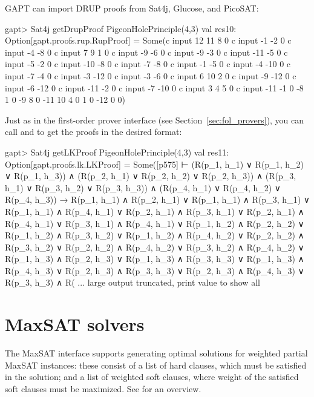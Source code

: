 \documentclass[a4paper,11pt]{book}
\newcommand{\cli}[1]{{\ttfamily {#1}}}
\begin{document}
GAPT can import DRUP proofs from Sat4j, Glucose, and PicoSAT:
\begin{clilisting}
gapt> Sat4j getDrupProof PigeonHolePrinciple(4,3)
val res10: Option[gapt.proofs.rup.RupProof] = Some(c input 12 11 8 0
c input -1 -2 0
c input -4 -8 0
c input 7 9 1 0
c input -9 -6 0
c input -9 -3 0
c input -11 -5 0
c input -5 -2 0
c input -10 -8 0
c input -7 -8 0
c input -1 -5 0
c input -4 -10 0
c input -7 -4 0
c input -3 -12 0
c input -3 -6 0
c input 6 10 2 0
c input -9 -12 0
c input -6 -12 0
c input -11 -2 0
c input -7 -10 0
c input 3 4 5 0
c input -11 -1 0
-8 1 0
-9 8 0
-11 10 4 0
1 0
-12 0
 0)

\end{clilisting}

Just as in the first-order prover interface (see Section~\ref{sec:fol_provers}), you can call
\cli{getResolutionProof} and \cli{getLKProof} to get the proofs in the desired
format:
\begin{clilisting}
gapt> Sat4j getLKProof PigeonHolePrinciple(4,3)
val res11: Option[gapt.proofs.lk.LKProof] = Some([p575] 
⊢
(R(p_1, h_1) ∨ R(p_1, h_2) ∨ R(p_1, h_3)) ∧
    (R(p_2, h_1) ∨ R(p_2, h_2) ∨ R(p_2, h_3)) ∧
    (R(p_3, h_1) ∨ R(p_3, h_2) ∨ R(p_3, h_3)) ∧
    (R(p_4, h_1) ∨ R(p_4, h_2) ∨ R(p_4, h_3)) →
  R(p_1, h_1) ∧ R(p_2, h_1) ∨
    R(p_1, h_1) ∧ R(p_3, h_1) ∨
    R(p_1, h_1) ∧ R(p_4, h_1) ∨
    R(p_2, h_1) ∧ R(p_3, h_1) ∨
    R(p_2, h_1) ∧ R(p_4, h_1) ∨
    R(p_3, h_1) ∧ R(p_4, h_1) ∨
    R(p_1, h_2) ∧ R(p_2, h_2) ∨
    R(p_1, h_2) ∧ R(p_3, h_2) ∨
    R(p_1, h_2) ∧ R(p_4, h_2) ∨
    R(p_2, h_2) ∧ R(p_3, h_2) ∨
    R(p_2, h_2) ∧ R(p_4, h_2) ∨
    R(p_3, h_2) ∧ R(p_4, h_2) ∨
    R(p_1, h_3) ∧ R(p_2, h_3) ∨
    R(p_1, h_3) ∧ R(p_3, h_3) ∨
    R(p_1, h_3) ∧ R(p_4, h_3) ∨
    R(p_2, h_3) ∧ R(p_3, h_3) ∨
    R(p_2, h_3) ∧ R(p_4, h_3) ∨
    R(p_3, h_3) ∧ R( ... large output truncated, print value to show all

\end{clilisting}

\section{MaxSAT solvers}

The MaxSAT interface supports generating optimal solutions for weighted partial
MaxSAT instances: these consist of a list of hard clauses, which must be
satisfied in the solution; and a list of weighted soft clauses, where weight of
the satisfied soft clauses must be maximized.  See \cite{Argelich2008First}
for an overview.
\end{document}

